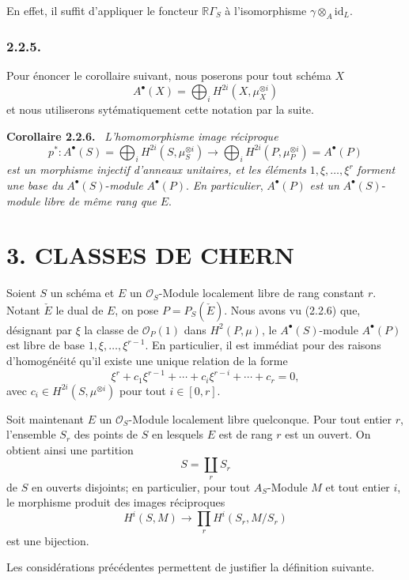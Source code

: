 \documentclass[11pt]{article}
\newenvironment{statement}[1]{\par\medskip\noindent\textbf{#1.}\ }{\par\medskip}
\newcommand{\R}{\mathbb{R}}\newcommand{\RHomCore}{\mathbb{R}\mathrm{Hom}}
\providecommand{\R}{\mathrm R}
\begin{document}
En effet, il suffit d'appliquer le foncteur $\R\Gamma_S$ à l'isomorphisme $\gamma\otimes_A\mathrm{id}_L$.

\subsubsection*{2.2.5.}
Pour énoncer le corollaire suivant, nous poserons pour tout schéma $X$
\[
A^\bullet(X)=\bigoplus_i H^{2i}(X,\mu_X^{\otimes i})
\]
et nous utiliserons sytématiquement cette notation par la suite.

\begin{statement}{Corollaire 2.2.6}
\emph{L'homomorphisme image réciproque}
\[
p^*:A^\bullet(S)=\bigoplus_i H^{2i}(S,\mu_S^{\otimes i})
\longrightarrow
\bigoplus_i H^{2i}(P,\mu_P^{\otimes i})=A^\bullet(P)
\]
\emph{est un morphisme injectif d'anneaux unitaires, et les éléments} $1,\xi,\ldots,\xi^r$ \emph{forment une base du} $A^\bullet(S)$-\emph{module} $A^\bullet(P)$. \emph{En particulier}, $A^\bullet(P)$ \emph{est un} $A^\bullet(S)$-\emph{module libre de même rang que} $E$.
\end{statement}

\section*{3. CLASSES DE CHERN}

Soient $S$ un schéma et $E$ un $\mathcal O_S$-Module localement libre de rang constant $r$. Notant $\check E$ le dual de $E$, on pose $P=P_S(\check E)$. Nous avons vu (2.2.6) que, désignant par $\xi$ la classe de $\mathcal O_P(1)$ dans $H^2(P,\mu)$, le $A^\bullet(S)$-module $A^\bullet(P)$ est libre de base $1,\xi,\ldots,\xi^{r-1}$. En particulier, il est immédiat pour des raisons d'homogénéité qu'il existe une unique relation de la forme
\[
\xi^r+c_1\xi^{r-1}+\cdots+c_i\xi^{r-i}+\cdots+c_r=0,
\tag*{3.1.}
\]
avec $c_i\in H^{2i}(S,\mu^{\otimes i})$ pour tout $i\in[0,r]$.

Soit maintenant $E$ un $\mathcal O_S$-Module localement libre quelconque. Pour tout entier $r$, l'ensemble $S_r$ des points de $S$ en lesquels $E$ est de rang $r$ est un ouvert. On obtient ainsi une partition
\[
S=\coprod_r S_r
\]
de $S$ en ouverts disjoints; en particulier, pour tout $A_S$-Module $M$ et tout entier $i$, le morphisme produit des images réciproques
\[
H^i(S,M)\longrightarrow \prod_r H^i(S_r,M/S_r)
\]
est une bijection.

Les considérations précédentes permettent de justifier la définition suivante.
\end{document}
